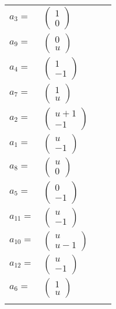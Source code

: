 \documentclass[1p]{elsarticle_modified}
\theoremstyle{definition}
\begin{document}
\begin{tabular}{m{7pt} m{180pt} m{7pt} m{180pt} }
\flushright $a_{3}=$&$\begin{pmatrix}1\\0\end{pmatrix}$ \\
\flushright $a_{9}=$&$\begin{pmatrix}0\\u\end{pmatrix}$ \\
\flushright $a_{4}=$&$\begin{pmatrix}1\\-1\end{pmatrix}$ \\
\flushright $a_{7}=$&$\begin{pmatrix}1\\u\end{pmatrix}$ \\
\flushright $a_{2}=$&$\begin{pmatrix}u+1\\-1\end{pmatrix}$ \\
\flushright $a_{1}=$&$\begin{pmatrix}u\\-1\end{pmatrix}$ \\
\flushright $a_{8}=$&$\begin{pmatrix}u\\0\end{pmatrix}$ \\
\flushright $a_{5}=$&$\begin{pmatrix}0\\-1\end{pmatrix}$ \\
\flushright $a_{11}=$&$\begin{pmatrix}u\\-1\end{pmatrix}$ \\
\flushright $a_{10}=$&$\begin{pmatrix}u\\u-1\end{pmatrix}$ \\
\flushright $a_{12}=$&$\begin{pmatrix}u\\-1\end{pmatrix}$ \\
\flushright $a_{6}=$&$\begin{pmatrix}1\\u\end{pmatrix}$\\&\end{tabular}
\end{document}
